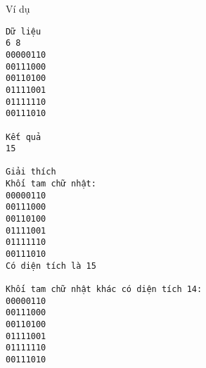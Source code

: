 Ví dụ
\begin{verbatim}
Dữ liệu
6 8
00000110
00111000
00110100
01111001
01111110
00111010

Kết quả
15

Giải thích
Khối tam chữ nhật:
00000110
00111000
00110100
01111001
01111110
00111010  
Có diện tích là 15

Khối tam chữ nhật khác có diện tích 14:
00000110
00111000
00110100
01111001
01111110
00111010 
\end{verbatim}